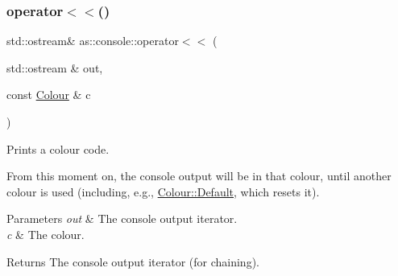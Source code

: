 \subsubsection{\texorpdfstring{operator$<$$<$()}{operator<<()}}
{\footnotesize\ttfamily std\+::ostream\& as\+::console\+::operator$<$$<$ (\begin{DoxyParamCaption}\item[{std\+::ostream \&}]{out,  }\item[{const \hyperlink{namespaceas_1_1console_ab2f5a531e43f4ee9e0f348f8aa5ce16c}{Colour} \&}]{c }\end{DoxyParamCaption})\hspace{0.3cm}{\ttfamily [inline]}}



Prints a colour code. 

From this moment on, the console output will be in that colour, until another colour is used (including, e.\+g., \hyperlink{namespaceas_1_1console_ab2f5a531e43f4ee9e0f348f8aa5ce16ca7a1920d61156abc05a60135aefe8bc67}{Colour\+::\+Default}, which resets it).


\begin{DoxyParams}{Parameters}
{\em out} & The console output iterator. \\
\hline
{\em c} & The colour. \\
\hline
\end{DoxyParams}
\begin{DoxyReturn}{Returns}
The console output iterator (for chaining). 
\end{DoxyReturn}

